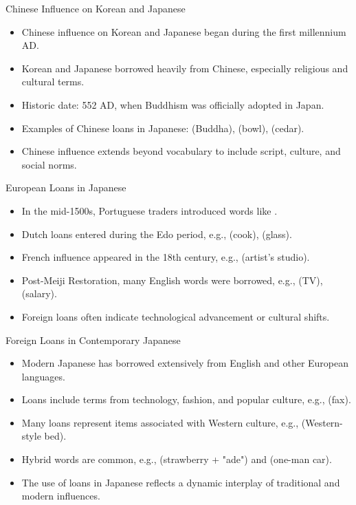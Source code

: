 \documentclass{beamer}
\begin{document}
\begin{frame}{Chinese Influence on Korean and Japanese}
    \begin{itemize}
        \item Chinese influence on Korean and Japanese began during the first millennium AD.
        \item Korean and Japanese borrowed heavily from Chinese, especially religious and cultural terms.
        \item Historic date: 552 AD, when Buddhism was officially adopted in Japan.
        \item Examples of Chinese loans in Japanese:  (Buddha),  (bowl),  (cedar).
        \item Chinese influence extends beyond vocabulary to include script, culture, and social norms.
    \end{itemize}
\end{frame}

\begin{frame}{European Loans in Japanese}
    \begin{itemize}
        \item In the mid-1500s, Portuguese traders introduced words like .
        \item Dutch loans entered during the Edo period, e.g.,  (cook),  (glass).
        \item French influence appeared in the 18th century, e.g.,  (artist's studio).
        \item Post-Meiji Restoration, many English words were borrowed, e.g.,  (TV),  (salary).
        \item Foreign loans often indicate technological advancement or cultural shifts.
    \end{itemize}
\end{frame}

\begin{frame}{Foreign Loans in Contemporary Japanese}
    \begin{itemize}
        \item Modern Japanese has borrowed extensively from English and other European languages.
        \item Loans include terms from technology, fashion, and popular culture, e.g.,  (fax).
        \item Many loans represent items associated with Western culture, e.g.,  (Western-style bed).
        \item Hybrid words are common, e.g.,  (strawberry + "ade") and  (one-man car).
        \item The use of loans in Japanese reflects a dynamic interplay of traditional and modern influences.
    \end{itemize}
\end{frame}
\end{document}
